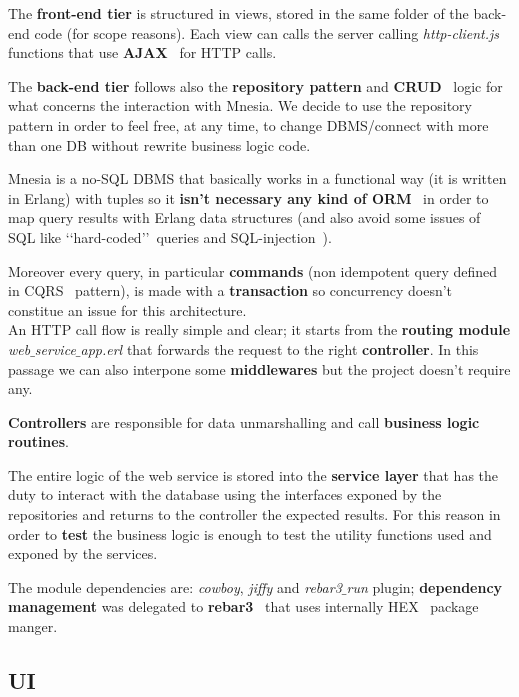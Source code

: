 The \textbf{front-end tier} is structured in views, stored in the same folder of the 
back-end code (for scope reasons). 
Each view can calls the server calling \textit{http-client.js} 
functions that use \textbf{AJAX}~\cite{12} for HTTP calls. 

The \textbf{back-end tier} follows also the \textbf{repository pattern} and 
\textbf{CRUD}~\cite{13} logic 
for what concerns the interaction with Mnesia. We decide to use the repository pattern 
in order to feel free, at any time, to change DBMS/connect with more than one DB without 
rewrite business logic code.

Mnesia is a no-SQL DBMS that basically works in a functional way (it is written in Erlang)
with tuples so it \textbf{isn't necessary any kind of ORM}~\cite{7} in order 
to map query results with Erlang data structures (and also avoid some issues of SQL 
like \lq\lq hard-coded\rq\rq\ queries and SQL-injection~\cite{8}).

Moreover every query, in particular \textbf{commands} (non idempotent query defined in 
CQRS~\cite{14} pattern), is made with a \textbf{transaction} so concurrency 
doesn't constitue an issue for this architecture.\\

\noindent
An HTTP call flow is really simple and clear; it starts from the \textbf{routing module} 
\textit{web$\_$service$\_$app.erl} that forwards the request to the right 
\textbf{controller}. In this passage we can also interpone some \textbf{middlewares} 
but the project doesn't require any.

\textbf{Controllers} are responsible for data unmarshalling and 
call \textbf{business logic routines}. 

The entire logic of the web service is 
stored into the \textbf{service layer} that has the duty to interact with 
the database using the interfaces exponed by the repositories and returns to 
the controller the expected results. For this reason in order to \textbf{test} 
the business logic is enough to test the utility functions used and exponed 
by the services.  

The module dependencies are: \textit{cowboy}, \textit{jiffy} and \textit{rebar3$\_$run} 
plugin; \textbf{dependency management} was delegated to \textbf{rebar3}~\cite{17} 
that uses internally HEX~\cite{18} package manger.


\subsection{UI}

